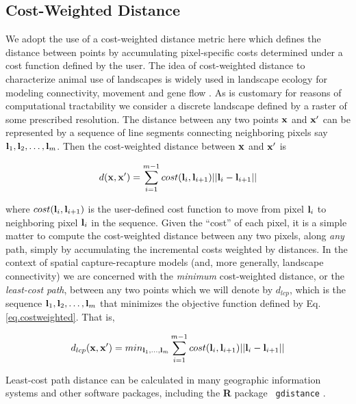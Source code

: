 \documentclass[12pt]{article}
\begin{document}
\begin{spacing}{1.8}
\section{Cost-Weighted Distance}

We adopt the use of a cost-weighted distance metric here which defines
the distance between points by accumulating pixel-specific costs
determined under a cost function defined by the user.  The idea of
cost-weighted distance to characterize animal use of landscapes is
widely used in landscape ecology for modeling connectivity, movement
and gene flow \citep{beier_etal:2008}. As is customary for reasons of
computational tractability we consider a discrete landscape defined by
a raster of some prescribed resolution. The distance between any two
points ${\bf x}$ and ${\bf x}'$ can be represented by a sequence of
line segments connecting neighboring pixels say ${\bf l}_{1},{\bf
  l}_{2},\ldots,{\bf l}_{m}$. Then the cost-weighted distance between
${\bf x}$ and ${\bf x}'$ is

\begin{equation}
 d({\bf x},{\bf x}')
  =  \sum_{i=1}^{m-1} cost({\bf l}_{i},{\bf l}_{i+1})||{\bf l}_{i} - {\bf l}_{i+1}||
\label{eq.costweighted}
\end{equation}

{\flushleft
where } $cost({\bf l}_{i},{\bf l}_{i+1})$ is the user-defined cost function
to move
from pixel ${\bf l}_{i}$ to neighboring pixel ${\bf l}_{i}$ in the sequence.
Given the ``cost'' of each pixel, it is a simple matter to compute the
cost-weighted distance between any two pixels, along {\it any} path,
simply by accumulating the incremental  costs weighted by
distances.
In the context of
spatial capture-recapture models (and, more generally, landscape
connectivity) we are concerned with the {\it minimum} cost-weighted
distance, or the {\it least-cost path}, between any two points which
we will denote by $d_{lcp}$, which is
the
sequence ${\bf l}_{1},{\bf l}_{2},\ldots,{\bf l}_{m}$ that minimizes
the objective function defined by Eq. \ref{eq.costweighted}. That is,

\begin{equation}
 d_{lcp}({\bf x},{\bf x}')
  =  min_{{\bf l}_{1},\ldots,{\bf l}_{m}}  \sum_{i=1}^{m-1} cost({\bf l}_{i},{\bf l}_{i+1})||{\bf l}_{i} - {\bf l}_{i+1}||
\label{eq.lcp}
\end{equation}

{\flushleft
 Least-cost} path distance can be calculated in
 many geographic information systems and other software packages,
including the {\bf R} package \mbox{\tt
  gdistance} \citep{vanetten:2011}.



\end{spacing}
\end{document}
